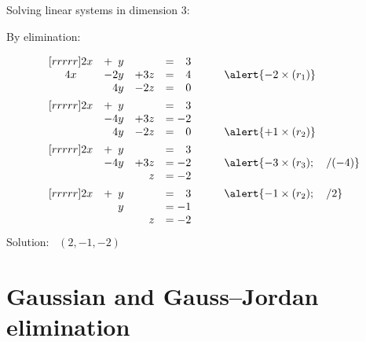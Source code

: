 \documentclass%
[handout]%
{beamer}
\begin{document}
\begin{frame}[label=solving-3]{Solving linear systems in dimension $3$:}

\vspace*{-8pt}

\begin{block}{By elimination:}

\vspace*{-8pt}

\begin{align*}
    &\begin{matrix}[rrrrr]
        2x &+ \hphantom{2}y & &= \hphantom{-}3 &\\
        4x &- 2y & + 3z&= \hphantom{-}4 & \qquad \alert{-2\times(r_1)}\\
            & \hphantom{-}4y & -2z &=\hphantom{-}0 &
    \end{matrix}
\\
     &\begin{matrix}[rrrrr]
        2x &+ \hphantom{2}y & &= \hphantom{-}3 &\\
           &- 4y & + 3z&= -2        &\\
            & \hphantom{-}4y & -2z &=\hphantom{-}0 &\qquad
                \alert{+ 1\times(r_2)}
    \end{matrix}
\\
     &\begin{matrix}[rrrrr]
        2x &+ \hphantom{2}y & & = \hphantom{-}3 & \\
           &- 4y & + 3z&= -2 & \qquad\alert{-3\times(r_3); \quad /(-4)}\\
            &  & \hphantom{-2}z &=-2 &
    \end{matrix}
\\
     &\begin{matrix}[rrrrr]
        2x &+ \hphantom{2}y & & = \hphantom{-}3 & \qquad\alert{-1\times(r_2); \quad /2} \\
           &\hphantom{- 4}y & &= -1 & \\
            &  & \hphantom{-2}z &=-2 &
    \end{matrix}
\end{align*}
 \alert{Solution:} \ $(2,-1,-2)$
\end{block}


\end{frame}

\section{Gaussian and Gauss--Jordan elimination}
\end{document}
